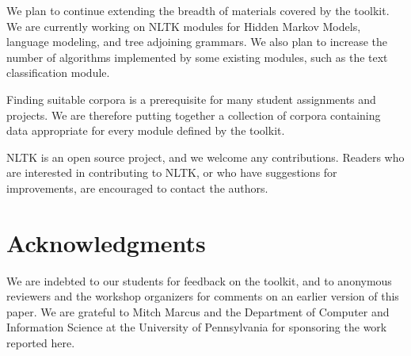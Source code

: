 \documentclass[11pt]{article}
\begin{document}

We plan to continue extending the breadth of materials covered by
the toolkit.  We are currently working on NLTK modules for Hidden
Markov Models, language modeling, and tree adjoining grammars.  We
also plan to increase the number of algorithms implemented by some
existing modules, such as the text classification module.

Finding suitable corpora is a prerequisite for many student assignments and
projects.  We are therefore putting together a collection of corpora
containing data appropriate for every module defined by the toolkit.

NLTK is an open source project, and we welcome any contributions.
Readers who are interested in contributing to NLTK, or who have
suggestions for improvements, are encouraged to contact the authors.


\section{Acknowledgments}
\label{sec:acknowledgments}

We are indebted to our students for feedback on the toolkit,
and to anonymous reviewers and the workshop organizers for comments
on an earlier version of this paper.  We are grateful to Mitch
Marcus and the Department of Computer and Information Science
at the University of Pennsylvania for sponsoring the work
reported here.



\end{document}
